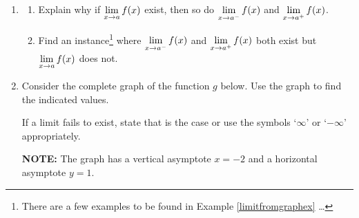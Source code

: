 \documentclass{ximera}
\begin{document}
\begin{enumerate}
\begin{multicols}{4}
\begin{itemize}
\end{itemize}

\end{multicols}

\bigskip

\begin{multicols}{4}

\begin{itemize}

\item $\ds{\lim_{x \rightarrow 0} f(x)}$

\item  $f(0)$

\item $\ds{\lim_{x \rightarrow 3^{-}} f(x)}$

\item $\ds{\lim_{x \rightarrow 3^{+}} f(x)}$
\end{itemize}

\end{multicols}

\bigskip


\item\label{twosidedonesidedlimitexistexercise}  \begin{enumerate}  \item  Explain why if $\ds{\lim_{x \rightarrow a} f(x)}$ exist, then so do $\ds{\lim_{x \rightarrow a^{-}} f(x)}$ and $\ds{\lim_{x \rightarrow a^{+}} f(x)}$.

\item   Find an instance\footnote{There are a few examples to be found in Example \ref{limitfromgraphex} \ldots}  where   $\ds{\lim_{x \rightarrow a^{-}} f(x)}$ and $\ds{\lim_{x \rightarrow a^{+}} f(x)}$ both exist but $\ds{\lim_{x \rightarrow a} f(x)}$ does not.

\end{enumerate}

\item  Consider the complete graph of the function $g$ below.  Use the graph to find the indicated values.

\smallskip


If a limit fails to exist, state that is the case  or use the symbols `$\infty$' or `$-\infty$' appropriately.
  
\smallskip

 
 \textbf{NOTE:}  The graph has a vertical asymptote $x=-2$ and a horizontal asymptote $y = 1$.  



\begin{center}


\end{center}
\end{enumerate}
\end{document}
